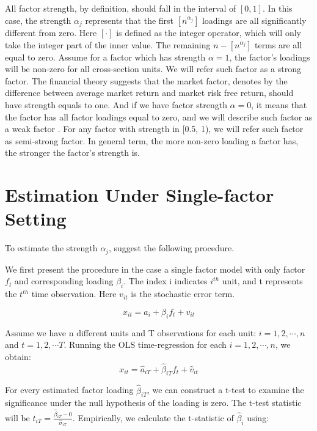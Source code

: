 All factor strength, by definition, should fall in the interval of $[0,1]$.
In this case, the strength $\alpha_j$ represents that the first $[n^{\alpha_j}]$ loadings are all significantly different from zero.
Here $[\cdot]$ is defined as the integer operator, which will only take the integer part of the inner value.
The remaining $n - [n^{\alpha_j}]$ terms are all equal to zero. 
Assume for a factor which has strength $\alpha = 1$, the factor's loadings will be non-zero for all cross-section units.
We will refer such factor as a strong factor.
The financial theory suggests that the market factor, denotes by the difference between average market return and market risk free return, should have strength equals to one.
And if we have factor strength $\alpha = 0$, it means that the factor has all factor loadings equal to zero, and we will describe such factor as a weak factor \cite{Bailey2016}.
For any factor with strength in [0.5, 1), we will refer such factor as semi-strong factor.
In general term, the more non-zero loading a factor has, the stronger the factor's strength is. 

\section{Estimation Under Single-factor Setting}\label{strength_one_factor_estimation}
To estimate the strength $\alpha_j$,  suggest the following procedure.

We first present the procedure in the case a single factor model with only factor $f_t$ and corresponding loading $\beta_{i}$.
The index i indicates $i^{th}$ unit, and t represents the $t^{th}$ time observation.
Here $v_{it}$ is the stochastic error term.

\[  x_{it} = a_{i} +  \beta_{i}f_{t} + v_{it} \tag{2} \label{estimation_model}\]

Assume we have n different units and T observations for each unit: $i = 1, 2,  \cdots, n$ and $t = 1,2, \cdots T$.
Running the OLS time-regression for each $i = 1,2, \cdots, n$, we obtain:
\[   x_{it} = \hat{a}_{iT} +  \hat{\beta}_{iT}f_{t} + \hat{v}_{it}  \]

For every estimated factor loading $\hat{\beta}_{iT}$, we can construct a t-test to examine the significance under the null hypothesis of the loading is zero.
The t-test statistic will be $t_{iT} = \frac{\hat{\beta}_{iT} - 0}{\hat{\sigma}_{iT}}$.  
Empirically, we calculate the t-statistic of $\hat{\beta}_i$ using:

